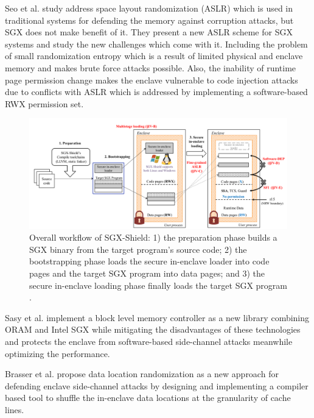 Seo et al. \cite{sgxshield} study address space layout randomization (ASLR) which is used in traditional systems for defending the memory against corruption attacks, but SGX does not make benefit of it. They present a new ASLR scheme for SGX systems and study the new challenges which come with it. Including the problem of small randomization entropy which is a result of limited physical and enclave memory and makes brute force attacks possible. Also, the inability of runtime page permission change makes the enclave vulnerable to code injection attacks due to conflicts with ASLR which is addressed by implementing a software-based RWX permission set.

\begin{figure}
	\includegraphics[scale=0.2]{images/sgxshield}
	\caption{Overall workflow of SGX-Shield: 1) the preparation phase builds a SGX binary from the target program's source code; 2) the bootstrapping phase loads the secure in-enclave loader into code pages and the target SGX program into data pages; and 3) the secure in-enclave loading phase finally loads the target SGX program \cite{sgxshield}.}
	\label{fig:sgxshield}
\end{figure}

Sasy et al. \cite{zerotrace} implement a block level memory controller as a new library combining ORAM \cite{oram1,oram2,oram3} and Intel SGX while mitigating the disadvantages of these technologies and protects the enclave from software-based side-channel attacks meanwhile optimizing the performance.

Brasser et al. \cite{drsgx} propose data location randomization as a new approach for defending enclave side-channel attacks by designing and implementing a compiler based tool to shuffle the in-enclave data locations at the granularity of cache lines.


